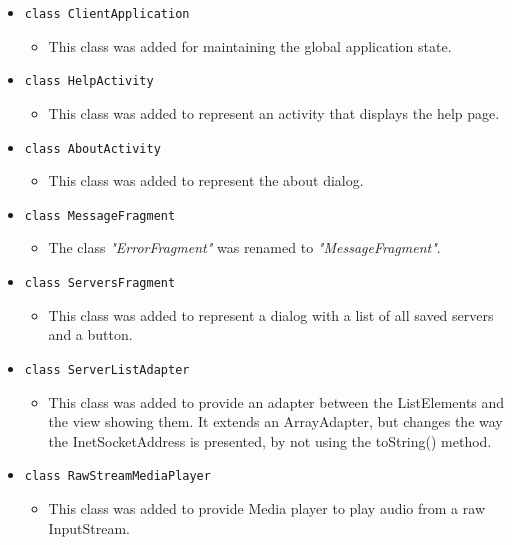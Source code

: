 \documentclass[a4paper,10pt]{scrartcl}
\begin{document}
\begin{itemize}
    \item \lstinline|class ClientApplication|
  \begin{itemize}
   \item This class was added for maintaining the global application state.
  \end{itemize}

  \item \lstinline|class HelpActivity|
  \begin{itemize}
   \item This class was added to represent an activity that displays the help page.
  \end{itemize}

  \item \lstinline|class AboutActivity|
  \begin{itemize}
   \item This class was added to represent the about dialog.
  \end{itemize}

   \item \lstinline|class MessageFragment|
  \begin{itemize}
   \item The class \textit{"ErrorFragment"} was renamed to \textit{"MessageFragment"}.
  \end{itemize}

  \item \lstinline|class ServersFragment|
  \begin{itemize}
   \item This class was added to represent a dialog with a list of all saved servers and a button.
  \end{itemize}

  \item \lstinline|class ServerListAdapter|
  \begin{itemize}
  \item This class was added to provide an adapter between the ListElements and the view showing them. It extends an ArrayAdapter, but changes the way the InetSocketAddress is presented, by not using the toString() method.
  \end{itemize}

  \item \lstinline|class RawStreamMediaPlayer|
  \begin{itemize}
  \item This class was added to provide Media player to play audio from a raw InputStream.
  \end{itemize}


\end{itemize}
\end{document}
